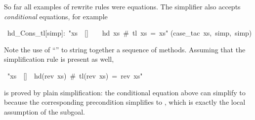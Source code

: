 \begin{isabelle}%
%
\begin{isamarkuptext}%
So far all examples of rewrite rules were equations. The simplifier also
accepts \emph{conditional} equations, for example%
\end{isamarkuptext}%
\ hd\_Cons\_tl[simp]:\ {"}xs\ {\isasymnoteq}\ []\ \ {\isasymLongrightarrow}\ \ hd\ xs\ \#\ tl\ xs\ =\ xs{"}\isanewline
{}(case\_tac\ xs,\ simp,\ simp)%
\begin{isamarkuptext}%
\noindent
Note the use of ``'' to string together a
sequence of methods. Assuming that the simplification rule
is present as well,%
\end{isamarkuptext}%
\ {"}xs\ {\isasymnoteq}\ []\ {\isasymLongrightarrow}\ hd(rev\ xs)\ \#\ tl(rev\ xs)\ =\ rev\ xs{"}%
\begin{isamarkuptext}%
\noindent
is proved by plain simplification:
the conditional equation  above
can simplify  to 
because the corresponding precondition 
simplifies to , which is exactly the local
assumption of the subgoal.%
\end{isamarkuptext}%
\end{isabelle}%
